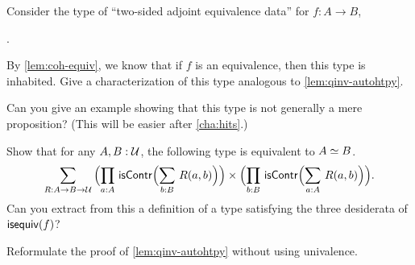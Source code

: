 \documentclass[hott-all.tex]{subfiles}
\begin{document}
%
%
%
%

\begin{ex}\label{ex:two-sided-adjoint-equivalences}
  Consider the type of ``two-sided adjoint equivalence data'' for $f:A\to B$,
  \begin{narrowmultline*}
    \narrowbreak
     \times
    .
  \end{narrowmultline*}
  By \cref{lem:coh-equiv}, we know that if $f$ is an equivalence, then this type is inhabited.
  Give a characterization of this type analogous to \cref{lem:qinv-autohtpy}.

  Can you give an example showing that this type is not generally a mere proposition?
  (This will be easier after \cref{cha:hits}.)
\end{ex}

\begin{ex}\label{ex:symmetric-equiv}
  Show that for any $A,B:\mathcal{U}$, the following type is equivalent to $A \simeq B$.
  \begin{equation*}
    \sm{R:A\to B\to \type}
    \Parens{\prd{a:A} \iscontr\Parens{\sm{b:B} R(a,b)}} \times
    \Parens{\prd{b:B} \iscontr\Parens{\sm{a:A} R(a,b)}}.
  \end{equation*}
  Can you extract from this a definition of a type satisfying the three desiderata of $\mathsf{isequiv}(f)$?
\end{ex}

\begin{ex} \label{ex:qinv-autohtpy-no-univalence}
  Reformulate the proof of \cref{lem:qinv-autohtpy} without using univalence.
\end{ex}
\end{document}
